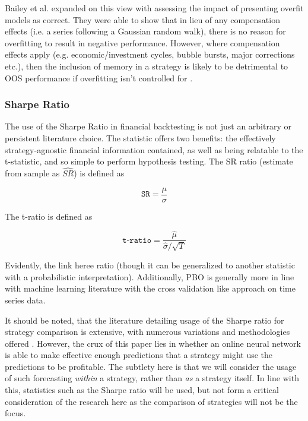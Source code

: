 \documentclass[a4paper,11pt,oneside]{article}
\theoremstyle{plain}
\theoremstyle{definition}
\begin{document}
Bailey et al. expanded on this view with assessing the impact of presenting overfit models as correct. 
They were able to show that in lieu of any compensation effects (i.e. a series following a Gaussian random walk), 
there is no reason for overfitting to result in negative performance. However, where compensation effects apply 
(e.g. economic/investment cycles, bubble bursts, major corrections etc.), then the inclusion of memory in a strategy
 is likely to be detrimental to OOS performance if overfitting isn’t controlled for \cite{BaileyBTL}.
\hfill \break 

\subsubsection {Sharpe Ratio}

The use of the Sharpe Ratio in financial backtesting is not just an arbitrary or persistent literature choice. 
The statistic offers two benefits: the effectively strategy-agnostic financial information contained, as well as being 
relatable to the t-statistic, and so simple to perform hypothesis testing. The SR ratio (estimate from sample as $\hat{SR}$) 
is defined as

\begin{equation}\label{SR}
  \texttt{SR}=\frac{\mu}{\sigma}
\end{equation}

The t-ratio is defined as 

\begin{equation}\label{tratio}
  \texttt{t-ratio} = \frac{\hat{\mu}}{\hat{\sigma}/\sqrt{T}}
\end{equation}

Evidently, the link heree ratio (though it can be generalized to another statistic with a probabilistic interpretation). Additionally, 
PBO is generally more in line with machine learning literature with the cross validation like approach on time series data.  
\hfill \break 

It should be noted, that the literature detailing usage of the Sharpe ratio for strategy comparison is extensive, with 
numerous variations and methodologies offered \cite{BaileySharpe}. However, the crux of this paper lies 
in whether an online neural network is able to make effective enough predictions that a strategy might use the 
predictions to be profitable. The subtlety here is that we will consider the usage of such forecasting \textit{within} a strategy,
 rather than \textit{as} a strategy itself. In line with this, statistics such as the Sharpe ratio will be used, but not form a critical 
 consideration of the research here as the comparison of strategies will not be the focus.
\hfill \break 
\end{document}
